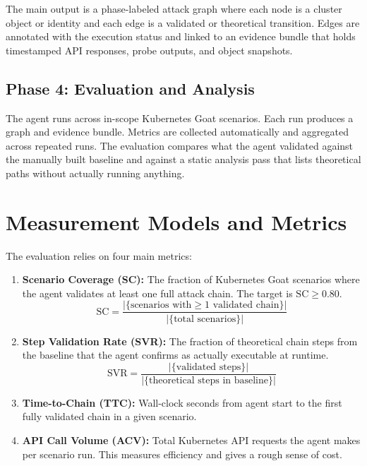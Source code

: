 \documentclass[conference]{IEEEtran}
\begin{document}
The main output is a phase-labeled attack graph where each node is a cluster object or identity and each edge is a validated or theoretical transition. Edges are annotated with the execution status and linked to an evidence bundle that holds timestamped API responses, probe outputs, and object snapshots.

\subsection{Phase 4: Evaluation and Analysis}
The agent runs across in-scope Kubernetes Goat scenarios. Each run produces a graph and evidence bundle. Metrics are collected automatically and aggregated across repeated runs. The evaluation compares what the agent validated against the manually built baseline and against a static analysis pass that lists theoretical paths without actually running anything.

\section{Measurement Models and Metrics}

The evaluation relies on four main metrics:

\begin{enumerate}
    \item \textbf{Scenario Coverage (SC):} The fraction of Kubernetes Goat scenarios where the agent validates at least one full attack chain. The target is $\text{SC} \geq 0.80$.
    \begin{equation}
        \text{SC} = \frac{|\{\text{scenarios with} \geq 1 \text{ validated chain}\}|}{|\{\text{total scenarios}\}|}
    \end{equation}

    \item \textbf{Step Validation Rate (SVR):} The fraction of theoretical chain steps from the baseline that the agent confirms as actually executable at runtime.
    \begin{equation}
        \text{SVR} = \frac{|\{\text{validated steps}\}|}{|\{\text{theoretical steps in baseline}\}|}
    \end{equation}

    \item \textbf{Time-to-Chain (TTC):} Wall-clock seconds from agent start to the first fully validated chain in a given scenario.

    \item \textbf{API Call Volume (ACV):} Total Kubernetes API requests the agent makes per scenario run. This measures efficiency and gives a rough sense of cost.
\end{enumerate}
\end{document}
